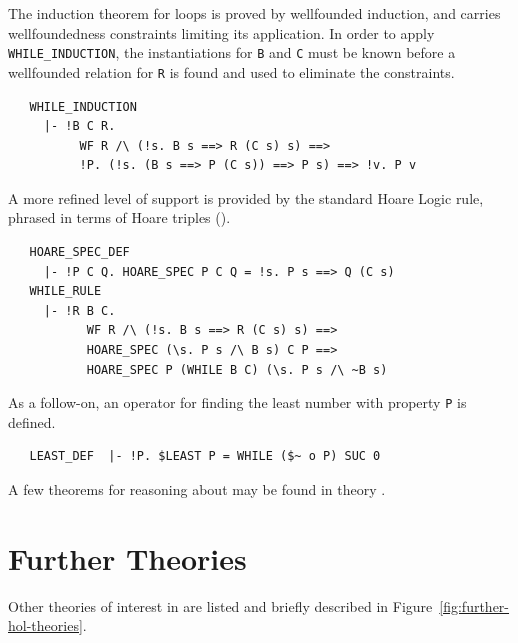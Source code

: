 {The induction theorem for  loops is proved by
wellfounded induction, and carries wellfoundedness constraints
limiting its application. In order to apply \verb+WHILE_INDUCTION+,
the instantiations for \verb+B+ and \verb+C+ must be known before
a wellfounded relation for \verb+R+ is found and used to eliminate the
constraints.
%
\begin{hol}
\begin{verbatim}
   WHILE_INDUCTION
     |- !B C R.
          WF R /\ (!s. B s ==> R (C s) s) ==>
          !P. (!s. (B s ==> P (C s)) ==> P s) ==> !v. P v
\end{verbatim}
\end{hol}
%
A more refined level of support is provided by the standard Hoare
Logic  rule, phrased in terms of Hoare triples
().
%
\begin{hol}
\begin{verbatim}
   HOARE_SPEC_DEF
     |- !P C Q. HOARE_SPEC P C Q = !s. P s ==> Q (C s)
   WHILE_RULE
     |- !R B C.
           WF R /\ (!s. B s ==> R (C s) s) ==>
           HOARE_SPEC (\s. P s /\ B s) C P ==>
           HOARE_SPEC P (WHILE B C) (\s. P s /\ ~B s)
\end{verbatim}
\end{hol}
%
As a follow-on, an operator for finding the least number with property
\verb+P+ is defined.
%
\begin{hol}
\begin{verbatim}
   LEAST_DEF  |- !P. $LEAST P = WHILE ($~ o P) SUC 0
\end{verbatim}
\end{hol}
%
A few theorems for reasoning about  may be found in
theory .



\section{Further Theories}
Other theories of interest in \HOL{} are listed and briefly described
in Figure~\ref{fig:further-hol-theories}.

}
